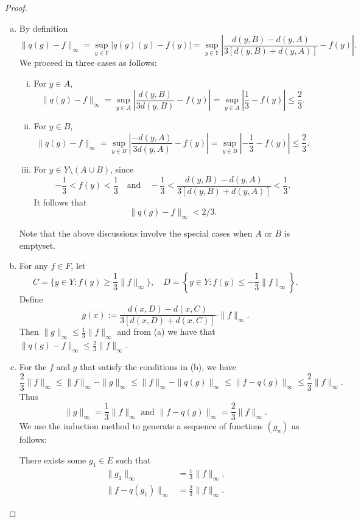 \begin{proof}
\begin{enumerate}[(a)]
  \item By definition
    \[\|q(g)-f\|_{\infty}=\sup_{y\in Y}|q(g)(y)-f(y)|
      = \sup_{y\in Y}\left|\frac{d(y,B)-d(y,A)}{3[d(y,B)+d(y,A)]}-f(y)\right|.\]
    We proceed in three cases as follows:
    \begin{enumerate}[(i)]
      \item For $y\in A$,
        \[\|q(g)-f\|_{\infty}=\sup_{y\in A}\left|\frac{d(y,B)}{3d(y,B)}-f(y)\right|=\sup_{y\in A}\left|\frac{1}{3}-f(y)\right|\leq\frac{2}{3}.\]
      \item For $y\in B$,
        \[\|q(g)-f\|_{\infty}=\sup_{y\in B}\left|\frac{-d(y,A)}{3d(y,A)}-f(y)\right|=\sup_{y\in B}\left|-\frac{1}{3}-f(y)\right|\leq\frac{2}{3}.\]
      \item For $y\in Y\setminus (A\cup B)$, since
        \[-\frac{1}{3}<f(y)<\frac{1}{3}
          \quad\text{and}\quad -\frac{1}{3}<\frac{d(y,B)-d(y,A)}{3[d(y,B)+d(y,A)]}<\frac{1}{3}.\]
        It follows that
        \[\|q(g)-f\|_{\infty} < 2/3.\]
    \end{enumerate}
    Note that the above discussions involve the special cases when $A$ or $B$
    is emptyset.
  \item For any $f\in F$, let
    \[C = \biggl\{y\in Y:f(y)\geq\frac{1}{3}\|f\|_{\infty}\biggr\},\quad 
      D = \left\{y\in Y:f(y)\leq-\frac{1}{3}\|f\|_{\infty}\right\}.\]
    Define
    \[g(x) := \frac{d(x,D)-d(x,C)}{3[d(x,D)+d(x,C)]}\cdot\|f\|_{\infty}.\]
    Then $\|g\|_{\infty}\leq\frac{1}{3}\|f\|_{\infty}$ and from (a) we have that
    $\|q(g)-f\|_{\infty}\leq\frac{2}{3}\|f\|_{\infty}$.
  \item For the $f$ and $g$ that satisfy the conditions in (b), we have
    \[\frac{2}{3}\|f\|_{\infty}\leq\|f\|_{\infty}-\|g\|_{\infty}
      \leq\|f\|_{\infty}-\|q(g)\|_{\infty}\leq\|f-q(g)\|_{\infty}\leq\frac{2}{3}\|f\|_{\infty}.\]
    Thus
    \[\|g\|_{\infty} = \frac{1}{3}\|f\|_{\infty}
      \text{ and }
      \|f-q(g)\|_{\infty } =\frac{2}{3}\|f\|_{\infty}.\]
    We use the induction method to generate a sequence of functions $(g_n)$ as follows:

    There exists some $g_1\in E$ such that
    \begin{align*}
      \|g_1\|_{\infty} & = \frac{1}{3}\|f\|_{\infty}, \\
      \|f-q(g_1)\|_{\infty} & = \frac{2}{3}\|f\|_{\infty}.
    \end{align*}


\end{enumerate}
\end{proof}
